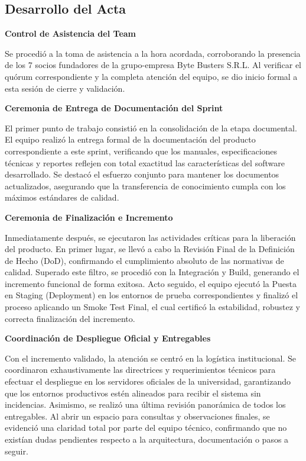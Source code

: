 \newpage
\subsection{Desarrollo del Acta}

\noindent \textbf{Control de Asistencia del Team}\par
Se procedió a la toma de asistencia a la hora acordada, corroborando la presencia de los 7 socios fundadores de la grupo-empresa Byte Busters S.R.L. Al verificar el quórum correspondiente y la completa atención del equipo, se dio inicio formal a esta sesión de cierre y validación.

\vspace*{0.5cm}
\noindent \textbf{Ceremonia de Entrega de Documentación del Sprint}\par
El primer punto de trabajo consistió en la consolidación de la etapa documental. El equipo realizó la entrega formal de la documentación del producto correspondiente a este sprint, verificando que los manuales, especificaciones técnicas y reportes reflejen con total exactitud las características del software desarrollado. Se destacó el esfuerzo conjunto para mantener los documentos actualizados, asegurando que la transferencia de conocimiento cumpla con los máximos estándares de calidad.

\vspace*{0.5cm}
\noindent \textbf{Ceremonia de Finalización e Incremento}\par
Inmediatamente después, se ejecutaron las actividades críticas para la liberación del producto. En primer lugar, se llevó a cabo la Revisión Final de la Definición de Hecho (DoD), confirmando el cumplimiento absoluto de las normativas de calidad. Superado este filtro, se procedió con la Integración y Build, generando el incremento funcional de forma exitosa. Acto seguido, el equipo ejecutó la Puesta en Staging (Deployment) en los entornos de prueba correspondientes y finalizó el proceso aplicando un Smoke Test Final, el cual certificó la estabilidad, robustez y correcta finalización del incremento.

\vspace*{0.5cm}
\noindent \textbf{Coordinación de Despliegue Oficial y Entregables}\par
Con el incremento validado, la atención se centró en la logística institucional. Se coordinaron exhaustivamente las directrices y requerimientos técnicos para efectuar el despliegue en los servidores oficiales de la universidad, garantizando que los entornos productivos estén alineados para recibir el sistema sin incidencias. Asimismo, se realizó una última revisión panorámica de todos los entregables. Al abrir un espacio para consultas y observaciones finales, se evidenció una claridad total por parte del equipo técnico, confirmando que no existían dudas pendientes respecto a la arquitectura, documentación o pasos a seguir.

